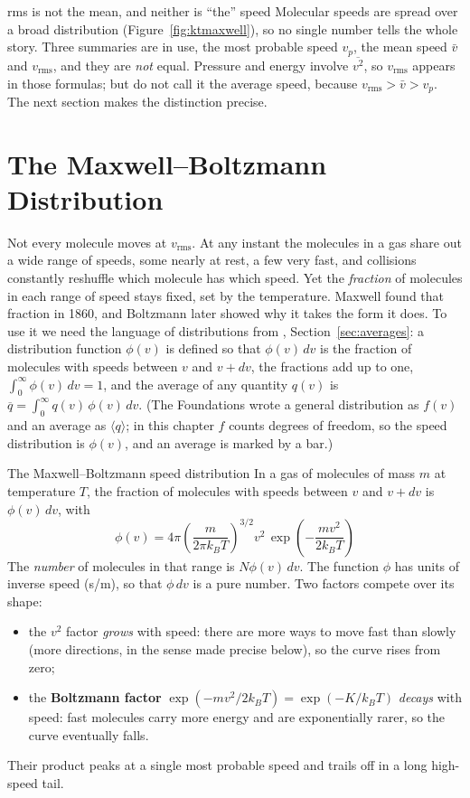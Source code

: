 \begin{trapbox}{rms is not the mean, and neither is ``the'' speed}
Molecular speeds are spread over a broad distribution (Figure~\ref{fig:ktmaxwell}), so no single number
tells the whole story. Three summaries are in use, the most probable speed $v_p$, the mean speed $\bar v$
and $v_{\text{rms}}$, and they are \emph{not} equal. Pressure and energy involve $\overline{v^2}$, so
$v_{\text{rms}}$ appears in those formulas; but do not call it the average speed, because
$v_{\text{rms}} > \bar v > v_p$. The next section makes the distinction precise.
\end{trapbox}

\section{The Maxwell--Boltzmann Distribution}\label{sec:ktmaxwell}

Not every molecule moves at $v_{\text{rms}}$. At any instant the molecules in a gas share out a wide range
of speeds, some nearly at rest, a few very fast, and collisions constantly reshuffle which molecule has
which speed. Yet the \emph{fraction} of molecules in each range of speed stays fixed, set by the
temperature. Maxwell found that fraction in 1860, and Boltzmann later showed why it takes the form it
does. To use it we need the language of distributions from ,
Section~\ref{sec:averages}: a distribution function $\phi(v)$ is defined so that $\phi(v)\,dv$ is the
fraction of molecules with speeds between $v$ and $v+dv$, the fractions add up to one,
$\int_0^\infty\phi(v)\,dv=1$, and the average of any quantity $q(v)$ is $\overline{q}=\int_0^\infty q(v)\,\phi(v)\,dv$. (The Foundations wrote a general distribution as $f(v)$ and an average as $\langle q\rangle$; in this chapter $f$ counts degrees of freedom, so the speed distribution is $\phi(v)$, and an average is marked by a bar.)

\begin{keybox}{The Maxwell--Boltzmann speed distribution}
In a gas of molecules of mass $m$ at temperature $T$, the fraction of molecules with speeds between $v$
and $v+dv$ is $\phi(v)\,dv$, with
\[
\boxed{\;\phi(v) = 4\pi\left(\frac{m}{2\pi k_BT}\right)^{\!3/2} v^2\,
\exp\!\left(-\frac{mv^2}{2k_BT}\right)\;}
\]
The \emph{number} of molecules in that range is $N\phi(v)\,dv$. The function $\phi$ has units of
inverse speed (\si{s/m}), so that $\phi\,dv$ is a pure number. Two factors compete over its shape:
\begin{itemize}
\item the $v^2$ factor \emph{grows} with speed: there are more ways to move fast than slowly (more
      directions, in the sense made precise below), so the curve rises from zero;
\item the \textbf{Boltzmann factor} $\exp(-mv^2/2k_BT)=\exp(-K/k_BT)$ \emph{decays} with speed: fast
      molecules carry more energy and are exponentially rarer, so the curve eventually falls.
\end{itemize}
Their product peaks at a single most probable speed and trails off in a long high-speed tail.
\end{keybox}

